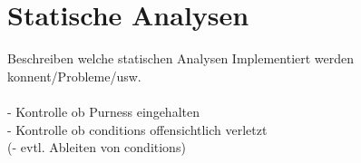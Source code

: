 \section{Statische Analysen}

Beschreiben welche statischen Analysen Implementiert werden konnent/Probleme/usw.\\
\\
- Kontrolle ob Purness eingehalten\\
- Kontrolle ob conditions offensichtlich verletzt\\
(- evtl. Ableiten von conditions)




